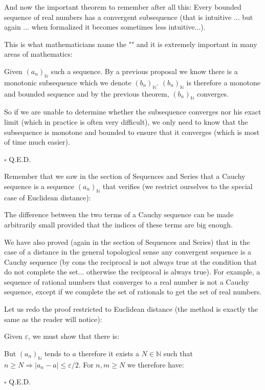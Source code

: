 	\begin{theorem}
	And now the important theorem to remember after all this: Every bounded sequence of real numbers has a convergent subsequence  (that is intuitive ... but again ... when formalized it becomes sometimes less intuitive...).
	
	This is what mathematicians name the "" and it is extremely important in many areas of mathematics:
	\end{theorem}
	\begin{dem}
	Given $(a_n)_\mathbb{N}$ such a sequence. By a previous proposal we know there is a monotonic subsequence which we denote $(b_n)_\mathbb{N}$. $(b_n)_\mathbb{N}$ is therefore a monotone and bounded sequence and by the previous theorem, $(b_n)_\mathbb{N}$ converges.
	
	So if we are unable to determine whether the subsequence converges nor his exact limit (which in practice is often very difficult), we only need to know that the subsequence is monotone and bounded to ensure that it converges (which is most of time much easier).
	\begin{flushright}
		$\square$  Q.E.D.
	\end{flushright}
	\end{dem}
	\begin{theorem}
	Remember that we saw in the section of Sequences and Series that a Cauchy sequence is a sequence $(a_n)_\mathbb{N}$ that verifies (we restrict ourselves to the special case of Euclidean distance):
	
	The difference between the two terms of a Cauchy sequence can be made arbitrarily small provided that the indices of these terms are big enough.
	
	We have also proved (again in the section of Sequences and Series) that in the case of a distance in the general topological sense any convergent sequence is a Cauchy sequence (by cons the reciprocal is not always true at the condition that do not complete the set... otherwise the reciprocal is always true). For example, a sequence of rational numbers that converges to a real number is not a Cauchy sequence, except if we complete the set of rationals to get the set of real numbers.
	\end{theorem}
	Let us redo the proof restricted to Euclidean distance (the method is exactly the same as the reader will notice):
	\begin{dem}
	Given $\varepsilon$, we must show that there is:
	
	But $(a_n)_\mathbb{N}$ tends to $a$ therefore it exists a $N\in \mathbb{N}$ such that $n\geq N \Rightarrow |a_n-a|\leq \varepsilon/2$. For $n,m\geq N$ we therefore have:
	
	\begin{flushright}
		$\square$  Q.E.D.
	\end{flushright}
	\end{dem}
